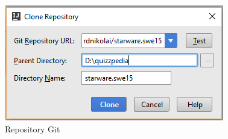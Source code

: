 \documentclass[12pt,a4paper]{article}
\begin{document}
	\begin{center}
		\begin{figure}[H]
			\centering \includegraphics[max width=\textwidth]{../img/manualeSviluppatore/repo.png}
			\caption{Repository Git}
		\end{figure}
	\end{center}	
	
\end{document}
